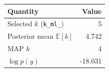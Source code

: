 \begin{tabular}{lr}\toprule
Quantity & Value\\\midrule
Selected $k$ (\texttt{k\_ml\_}) & 5\\
Posterior mean $\mathbb{E}[k]$ & 4.742\\
MAP $k$ & 4\\
$\log p(y)$ & -18.031\\
\bottomrule\end{tabular}

